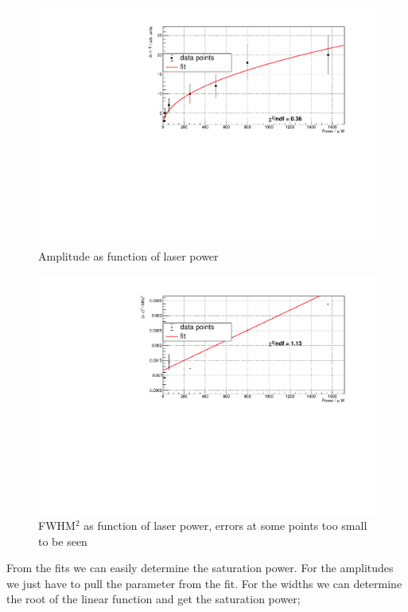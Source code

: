\documentclass[11pt,a4paper,notitlepage]{scrartcl}
\begin{document}
\begin{figure}[H]	
	\centering
	\includegraphics[width=\linewidth]{measurements/amps}
	\caption{Amplitude as function of laser power}
	\label{fig:b1}
\end{figure} 
\begin{figure}[H]	
	\centering
	\includegraphics[width=\linewidth]{measurements/widths_fit}
	\caption{FWHM$^2$ as function of laser power, errors at some points too small to be seen}
	\label{fig:b2}
\end{figure} 
From the fits we can easily determine the saturation power. For the amplitudes we just have to pull the parameter from the fit. For the widths we can determine the root of the linear function and get the saturation power;
\end{document}
